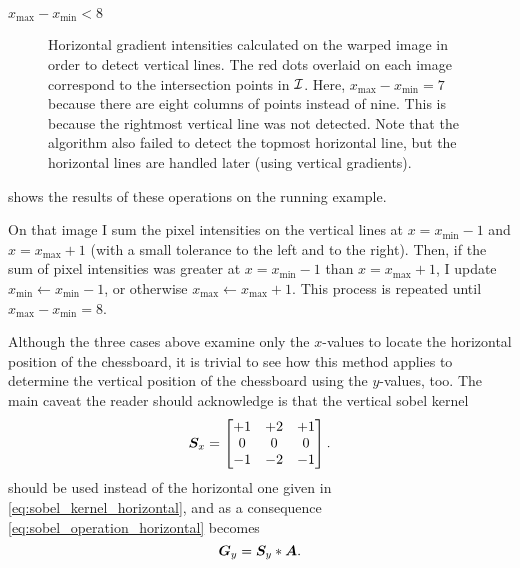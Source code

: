 \documentclass[../report.tex]{subfiles}
\begin{document}
\begin{caselist}
\begin{case}{$x_\text{max}-x_\text{min}<8$}
\begin{figure}
            \caption[Horizontal gradient intensities calculated on the warped image in order to detect vertical lines.]{Horizontal gradient intensities calculated on the warped image in order to detect vertical lines. The red dots overlaid on each image correspond to the intersection points in ${\mathcal{I}}$. Here, $x_\text{max}-x_\text{min}=7$ because there are eight columns of points instead of nine. This is because the rightmost vertical line was not detected. Note that the algorithm also failed to detect the topmost horizontal line, but the horizontal lines are handled later (using vertical gradients).}
            \label{fig:warped_image_gradients}
        \end{figure}
         shows the results of these operations on the running example.

        On that image I sum the pixel intensities on the vertical lines at $x=x_\text{min}-1$ and $x=x_\text{max}+1$ (with a small tolerance to the left and to the right).
        Then, if the sum of pixel intensities was greater at $x=x_\text{min}-1$ than $x=x_\text{max}+1$, I update $x_\text{min} \gets x_\text{min}-1$, or otherwise $x_\text{max} \gets x_\text{max}+1$.
        This process is repeated until $x_\text{max}-x_\text{min}=8$.
    \end{case}
\end{caselist}

Although the three cases above examine only the $x$-values to locate the horizontal position of the chessboard, it is trivial to see how this method applies to determine the vertical position of the chessboard using the $y$-values, too.
The main caveat the reader should acknowledge is that the vertical sobel kernel
\begin{equation}
    {\bm{S}}_x = \begin{bmatrix}
        +1 & +2 & +1\\
        0 & 0 & 0\\
        -1 & -2 & -1\\
    \end{bmatrix}.
\end{equation}
should be used instead of the horizontal one given in \cref{eq:sobel_kernel_horizontal}, and as a consequence \cref{eq:sobel_operation_horizontal} becomes
\begin{equation}
    {\bm{G}}_y = {\bm{S}}_y * {\bm{A}}.
\end{equation}
\end{document}
